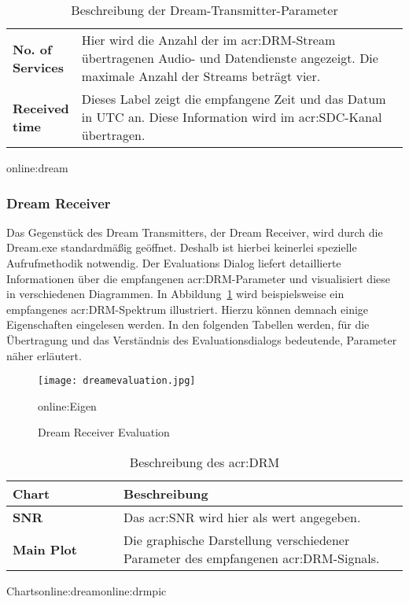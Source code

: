 \begin{table}[H]
\begin{center}
\begin{tabular}{p{0.17\linewidth}  p{0.83\linewidth}}
			\textbf{No. of Services} & Hier wird die Anzahl der im \gls{acr:DRM}-Stream übertragenen Audio- und Datendienste angezeigt. Die maximale Anzahl der Streams beträgt vier.\\
		
			\textbf{Received time} & Dieses Label zeigt die empfangene Zeit und das Datum in UTC an. Diese Information wird im \gls{acr:SDC}-Kanal übertragen.\\
			\bottomrule
		\end{tabular}
		\caption{Beschreibung der Dream-Transmitter-Parameter}\gls{online:dream}
		\label{tab:dreamparam}
	\end{center}
\end{table}

\newpage
\subsubsection{Dream Receiver}
\label{subsec:Unterabschnitt12}

Das Gegenstück des Dream Transmitters, der Dream Receiver, wird durch die Dream.exe standardmäßig geöffnet. Deshalb ist hierbei keinerlei spezielle Aufrufmethodik notwendig. Der Evaluations Dialog liefert detaillierte Informationen über die empfangenen \gls{acr:DRM}-Parameter und visualisiert diese in verschiedenen Diagrammen. In Abbildung~\ref{fig:dreamevaluation} wird beispielsweise ein empfangenes \gls{acr:DRM}-Spektrum illustriert. Hierzu können demnach einige Eigenschaften eingelesen werden. In den folgenden Tabellen werden, für die Übertragung und das Verständnis des Evaluationsdialogs bedeutende, Parameter näher erläutert.


\begin{figure}[H]
	\centering
	\texttt{[image: dreamevaluation.jpg]}
	\caption[Dream Receiver Evaluation]{Dream Receiver Evaluation}\gls{online:Eigen}
	\label{fig:dreamevaluation}
\end{figure}



\begin{table}[ht]
	\begin{center}
		\begin{tabular}{p{0.28\linewidth}  p{0.72\linewidth}}
			\toprule
			\textbf{Chart} & \textbf{Beschreibung} \\
			\midrule
			\textbf{SNR} & Das \gls{acr:SNR} wird hier als wert angegeben.\\
			\textbf{Main Plot} & Die graphische Darstellung verschiedener Parameter des empfangenen \gls{acr:DRM}-Signals. \\
			\bottomrule
		\end{tabular}
		\caption{Beschreibung des \gls{acr:DRM}}Charts\gls{online:dream}\gls{online:drmpic}
		\label{tab:drmchart}
	\end{center}
\end{table}


